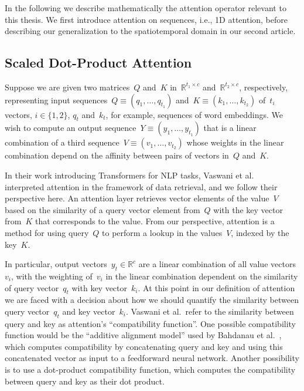 In the following we describe mathematically the attention operator relevant to
this thesis.
We first introduce attention on sequences, i.e., 1D attention, before
describing our generalization to the spatiotemporal domain in our second
article.


\subsection{Scaled Dot-Product Attention}

Suppose we are given two matrices~$Q$ and~$K$ in~$\mathbb{R}^{t_1 \times c}$
and~$\mathbb{R}^{t_2\times c}$, respectively, representing input
sequences~$Q \equiv (q_1, \dots, q_{t_1})$ and~$K \equiv (k_1, \dots, k_{t_2})$
of~$t_i$ vectors, $i \in \{1,2\}$, $q_t$ and~$k_t$, for example, sequences of word embeddings.
We wish to compute an output sequence~$Y \equiv (y_1, \dots, y_{t_1})$ that is
a linear combination of a third sequence~$V \equiv (v_1, \dots, v_{t_2})$ whose
weights in the linear combination depend on the affinity between pairs of
vectors in~$Q$ and~$K$.

In their work introducing Transformers for NLP tasks, Vaswani et
al.~\cite{vaswani2017attention} interpreted attention in the framework of data
retrieval, and we follow their perspective here.
An attention layer retrieves vector elements of the value~$V$ based on the
similarity of a query vector element from~$Q$ with the key vector from~$K$ that
corresponds to the value.
From our perspective, attention is a method for using query~$Q$ to perform a
lookup in the values~$V$, indexed by the key~$K$.

In particular, output vectors~$y_t \in \mathbb{R}^c$ are a linear combination
of all value vectors~$v_i$, with the weighting of~$v_i$ in the linear
combination dependent on the similarity of query vector~$q_t$ with key
vector~$k_i$.
At this point in our definition of attention we are faced with a decision about
how we should quantify the similarity between query vector~$q_t$ and key
vector~$k_i$.
Vaswani et al.\ refer to the similarity between query and key as attention's
``compatibility function''.
One possible compatibility function would be the ``additive alignment model''
used by Bahdanau et al.~\cite{bahdanau2015neuralmt}, which computes
compatibility by concatenating query and key and using this concatenated vector
as input to a feedforward neural network.
Another possibility is to use a dot-product compatibility function, which
computes the compatibility between query and key as their dot product.

